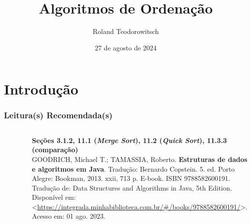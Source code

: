 \documentclass[aspectratio=169]{beamer}
\title[\sc{Algoritmos de Ordenação}]{Algoritmos de Ordenação}
\author[Roland Teodorowitsch]{Roland Teodorowitsch}
\institute[ALEST I - EP - PUCRS]{Algoritmos e Estruturas de Dados I - Escola Politécnica - PUCRS}
\date{27 de agosto de 2024}
\begin{document}
\justifying

\begin{frame}
	\titlepage
\end{frame}

\section{Introdução}

\begin{frame}\frametitle{Leitura(s) Recomendada(s)}

\begin{columns}[T]
\begin{column}{0.15\linewidth}
\vspace{-3mm}
\begin{figure}[h]
	\centering
	\includegraphics[height=0.3\paperheight]{imagens/livro_goodrich.jpg}
\end{figure}
\end{column}
\begin{column}{0.85\linewidth}
\vspace{3mm}
\textbf{Seções 3.1.2, 11.1 (\emph{Merge Sort}), 11.2 (\emph{Quick Sort}), 11.3.3 (comparação)}\\
\scriptsize{GOODRICH, Michael T.; TAMASSIA, Roberto. \textbf{Estruturas de dados e algoritmos em Java}. Tradução: Bernardo Copstein. 5. ed. Porto Alegre: Bookman, 2013. xxii, 713 p. E-book. ISBN 9788582600191. Tradução de: Data Structures and Algorithms in Java, 5th Edition. Disponível em: \textless{}\url{https://integrada.minhabiblioteca.com.br/\#/books/9788582600191/}\textgreater{}. Acesso em: 01 ago. 2023.}
\end{column}
\end{columns}

\end{frame}
\end{document}

